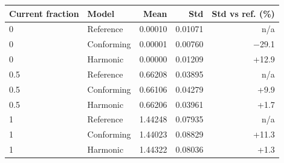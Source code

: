 \begin{tabular}{llrrr}\toprule
Current fraction & Model & Mean & Std & Std vs ref. (\%)\\\midrule
0 & Reference & 0.00010 & 0.01071 & n/a \\
0 & Conforming & 0.00001 & 0.00760 & $-$29.1 \\
0 & Harmonic & 0.00000 & 0.01209 & +12.9 \\
0.5 & Reference & 0.66208 & 0.03895 & n/a \\
0.5 & Conforming & 0.66106 & 0.04279 & +9.9 \\
0.5 & Harmonic & 0.66206 & 0.03961 & +1.7 \\
1 & Reference & 1.44248 & 0.07935 & n/a \\
1 & Conforming & 1.44023 & 0.08829 & +11.3 \\
1 & Harmonic & 1.44322 & 0.08036 & +1.3 \\
\bottomrule\end{tabular}
